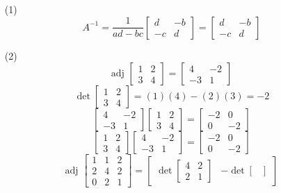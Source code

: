 \begin{itemize}
\item[(1)]
$$A^{-1} = \frac{1}{ad - bc}\begin{bmatrix}
d & -b \\
-c & d
\end{bmatrix} = \begin{bmatrix}
d & -b \\
-c & d
\end{bmatrix}$$
\item[(2)]
$$\text{adj }\begin{bmatrix}
1 & 2 \\
3 & 4
\end{bmatrix} = \begin{bmatrix}
4 & -2 \\
-3 & 1
\end{bmatrix}$$
$$\det\begin{bmatrix}
1 & 2 \\
3 & 4
\end{bmatrix} = (1)(4) - (2)(3) = -2$$
$$\begin{bmatrix}
4 & -2 \\
-3 & 1
\end{bmatrix}\begin{bmatrix}
1 & 2 \\
3 & 4
\end{bmatrix} = \begin{bmatrix}
-2 & 0 \\
0 & -2
\end{bmatrix}$$
$$\begin{bmatrix}
1 & 2 \\
3 & 4
\end{bmatrix}\begin{bmatrix}
4 & -2 \\
-3 & 1
\end{bmatrix} = \begin{bmatrix}
-2 & 0 \\
0 & -2
\end{bmatrix}$$
$$\text{adj }\begin{bmatrix}
1 & 1 & 2 \\
2 & 4 & 2 \\
0 & 2 & 1
\end{bmatrix} = \begin{bmatrix}
\det\begin{bmatrix}
4 & 2 \\
2 & 1
\end{bmatrix} & - \det\begin{bmatrix}

\end{bmatrix}
\end{bmatrix}$$
\end{itemize}
